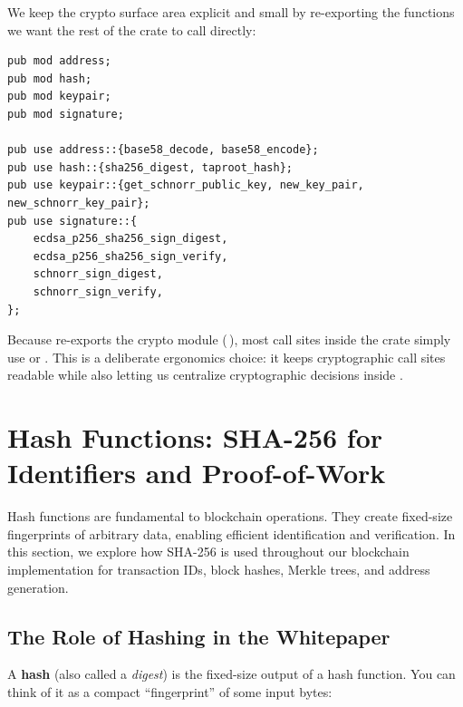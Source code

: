 We keep the crypto surface area explicit and small by re-exporting the functions we want the rest of the crate to call directly:

\begin{verbatim}
pub mod address;
pub mod hash;
pub mod keypair;
pub mod signature;

pub use address::{base58_decode, base58_encode};
pub use hash::{sha256_digest, taproot_hash};
pub use keypair::{get_schnorr_public_key, new_key_pair, new_schnorr_key_pair};
pub use signature::{
    ecdsa_p256_sha256_sign_digest,
    ecdsa_p256_sha256_sign_verify,
    schnorr_sign_digest,
    schnorr_sign_verify,
};
\end{verbatim}

Because  re-exports the crypto module (\,), most call sites inside the crate simply use  or . This is a deliberate ergonomics choice: it keeps cryptographic call sites readable while also letting us centralize cryptographic decisions inside .

\section{Hash Functions: SHA-256 for Identifiers and Proof-of-Work}
\label{sec:ch08-hash-functions}

Hash functions are fundamental to blockchain operations. They create fixed-size fingerprints of arbitrary data, enabling efficient identification and verification. In this section, we explore how SHA-256 is used throughout our blockchain implementation for transaction IDs, block hashes, Merkle trees, and address generation.

\subsection{The Role of Hashing in the Whitepaper}
\label{sec:ch08-hashing-whitepaper}

A \textbf{hash} (also called a \emph{digest}) is the fixed-size output of a hash function. You can think of it as a compact ``fingerprint'' of some input bytes:

